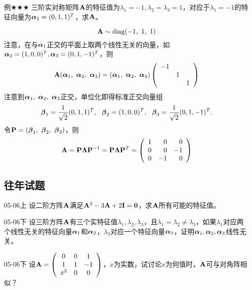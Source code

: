 \begin{frame}
  \begin{scriptsize}
    \begin{exampleblock}{例$\bigstar\bigstar\bigstar$}
      三阶实对称矩阵$\mathbf{A}$的特征值为$\lambda_1=-1,\lambda_2=\lambda_3=1$，对应于$\lambda_1=-1$的特征向量为$\boldsymbol{\alpha}_1=(0,1,1)^T$，求$\mathbf{A}$。
    \end{exampleblock}\pause\proofname
    $$
    \mathbf{A} \sim \mathrm{diag}(-1,~1,~1)
    $$ 
    注意，在与$\boldsymbol{\alpha}_1$正交的平面上取两个线性无关的向量，如$\boldsymbol{\alpha}_2=(1,0,0)^T,\boldsymbol{\alpha}_3=(0,1,-1)^T$，则
    $$
    \mathbf{A}(\boldsymbol{\alpha}_1,~\boldsymbol{\alpha}_2,~\boldsymbol{\alpha}_3)=(\boldsymbol{\alpha}_1,~\boldsymbol{\alpha}_2,~\boldsymbol{\alpha}_3)\left(
    \begin{array}{ccc}
      -1&&\\
      &1&\\
      &&1
    \end{array}
    \right)
    $$ 
    注意到$\boldsymbol{\alpha}_1,~\boldsymbol{\alpha}_2,~\boldsymbol{\alpha}_3$正交，单位化即得标准正交向量组
    $$
    \boldsymbol{\beta}_1=\frac1{\sqrt{2}}(0,1,1)^T,~~
    \boldsymbol{\beta}_2=(1,0,0)^T,~~
    \boldsymbol{\beta}_3=\frac1{\sqrt{2}}(0,1,-1)^T.
    $$ 
    令$\mathbf{P}=(\boldsymbol{\beta}_1,~\boldsymbol{\beta}_2,~\boldsymbol{\beta}_3)$，则
    $$
    \mathbf{A}=\mathbf{P}\mathbf{\Lambda}\mathbf{P}^{-1}=\mathbf{P}\mathbf{\Lambda}\mathbf{P}^{T}
    = \left(
    \begin{array}{rrr}
      1&0&0\\
      0&0&-1\\
      0&-1&0
    \end{array}
    \right)
    $$
  \end{scriptsize}
\end{frame}


\subsection{往年试题}

\begin{frame} 
  \begin{footnotesize}
    \begin{exampleblock}{05-06上}
     设二阶方阵$\mathbf{A}$满足$\mathbf{A}^2-3\mathbf{A}+2\mathbf{I}=\mathbf{0}$，求$\mathbf{A}$所有可能的特征值。
    \end{exampleblock}

\begin{exampleblock}{05-06下}
     设三阶方阵$\mathbf{A}$有三个实特征值$\lambda_1,\lambda_2,\lambda_3$，且$\lambda_1=\lambda_2\ne\lambda_3$，如果$\lambda_1$对应两个线性无关的特征向量$\boldsymbol{\alpha}_1$和$\boldsymbol{\alpha}_2$，$\lambda_3$对应一个特征向量$\boldsymbol{\alpha}_3$，证明$\boldsymbol{\alpha}_1,\boldsymbol{\alpha}_2,\boldsymbol{\alpha}_3$线性无关。
    \end{exampleblock}

\begin{exampleblock}{05-06下}
     设$\mathbf{A}=\left(
\begin{array}{ccc}
0&0&1\\
1&1&-1\\
x^2&0&0
\end{array}
\right)$，$x$为实数，试讨论$x$为何值时，$\mathbf{A}$可与对角阵相似？
    \end{exampleblock}
  \end{footnotesize}
\end{frame}



